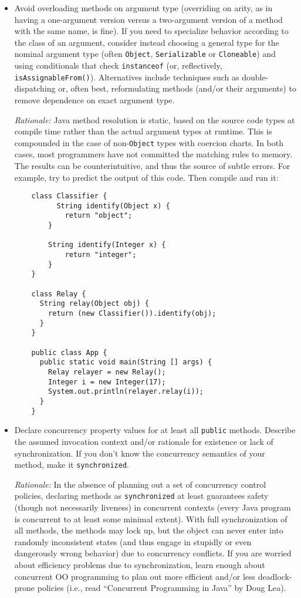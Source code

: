 \begin{itemize}
    \item 
    Avoid overloading methods on argument type (overriding on arity, as in having a one-argument version versus a two-argument version of a method with the same name, is fine). If you need to specialize behavior according to the class of an argument, consider instead choosing a general type for the nominal argument type (often \texttt{Object}, \texttt{Serializable} or \texttt{Cloneable}) and using conditionals that check \texttt{instanceof} (or, reflectively, \texttt{isAssignableFrom()}). Alternatives include techniques such as double-dispatching or, often best, reformulating methods (and/or their arguments) to remove dependence on exact argument type.

    \emph{Rationale:} Java method resolution is static, based on the source code types at compile time rather than the actual argument types at runtime. This is compounded in the case of non-\texttt{Object} types with coercion charts. In both cases, most programmers have not committed the matching rules to memory. The results can be counterintuitive, and thus the source of subtle errors. For example, try to predict the output of this code. Then compile and run it:

    \begin{lstlisting}
    class Classifier {
          String identify(Object x) {
            return "object";
        }
    
        String identify(Integer x) {
            return "integer";
        }
    }    

    class Relay {
      String relay(Object obj) { 
        return (new Classifier()).identify(obj);
      }
    }

    public class App {
      public static void main(String [] args) {
        Relay relayer = new Relay();
        Integer i = new Integer(17);
        System.out.println(relayer.relay(i));
      }
    }    
    \end{lstlisting}

    \item 
    Declare concurrency property values for at least all \texttt{public} methods. Describe the assumed invocation context and/or rationale for existence or lack of synchronization. If you don't know the concurrency semantics of your method, make it \texttt{synchronized}.

    \emph{Rationale:} In the absence of planning out a set of concurrency control policies, declaring methods as \texttt{synchronized} at least guarantees safety (though not necessarily liveness) in concurrent contexts (every Java program is concurrent to at least some minimal extent). With full synchronization of all methods, the methods may lock up, but the object can never enter into randomly inconsistent states (and thus engage in stupidly or even dangerously wrong behavior) due to concurrency conflicts. If you are worried about efficiency problems due to synchronization, learn enough about concurrent OO programming to plan out more efficient and/or less deadlock-prone policies (i.e., read ``Concurrent Programming in Java'' by Doug Lea).


\end{itemize}
